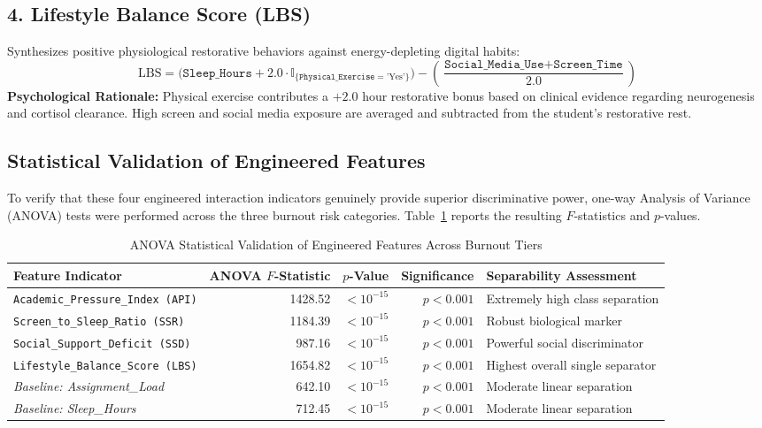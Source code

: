 \documentclass[12pt,a4paper,oneside]{report}
\begin{document}
\subsection{4. Lifestyle Balance Score (LBS)}
Synthesizes positive physiological restorative behaviors against energy-depleting digital habits:
\begin{equation}
    \text{LBS} = \Big( \texttt{Sleep\_Hours} + 2.0 \cdot \mathbb{I}_{\{\texttt{Physical\_Exercise} = \text{'Yes'}\}} \Big) - \left( \frac{\texttt{Social\_Media\_Use} + \texttt{Screen\_Time}}{2.0} \right)
    \label{eq:lbs_formulation}
\end{equation}
\textbf{Psychological Rationale:} Physical exercise contributes a $+2.0$ hour restorative bonus based on clinical evidence regarding neurogenesis and cortisol clearance. High screen and social media exposure are averaged and subtracted from the student's restorative rest.

\subsection{Statistical Validation of Engineered Features}
To verify that these four engineered interaction indicators genuinely provide superior discriminative power, one-way Analysis of Variance (ANOVA) tests were performed across the three burnout risk categories. Table~\ref{tab:anova_validation} reports the resulting $F$-statistics and $p$-values.

\begin{table}[H]
\centering
\caption{ANOVA Statistical Validation of Engineered Features Across Burnout Tiers}
\label{tab:anova_validation}
\small
\begin{tabularx}{\textwidth}{lrrrX}
\toprule
\textbf{Feature Indicator} & \textbf{ANOVA $F$-Statistic} & \textbf{$p$-Value} & \textbf{Significance} & \textbf{Separability Assessment} \\
\midrule
\texttt{Academic\_Pressure\_Index (API)} & 1428.52 & $< 10^{-15}$ & $p < 0.001$ & Extremely high class separation \\
\texttt{Screen\_to\_Sleep\_Ratio (SSR)} & 1184.39 & $< 10^{-15}$ & $p < 0.001$ & Robust biological marker \\
\texttt{Social\_Support\_Deficit (SSD)} & 987.16 & $< 10^{-15}$ & $p < 0.001$ & Powerful social discriminator \\
\texttt{Lifestyle\_Balance\_Score (LBS)} & 1654.82 & $< 10^{-15}$ & $p < 0.001$ & Highest overall single separator \\
\midrule
\textit{Baseline: Assignment\_Load} & 642.10 & $< 10^{-15}$ & $p < 0.001$ & Moderate linear separation \\
\textit{Baseline: Sleep\_Hours} & 712.45 & $< 10^{-15}$ & $p < 0.001$ & Moderate linear separation \\
\bottomrule
\end{tabularx}
\end{table}
\end{document}
